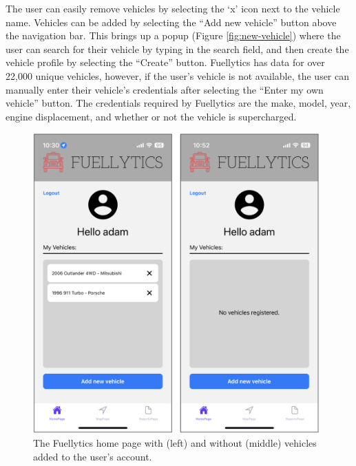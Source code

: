 \documentclass[11pt, oneside]{article}
\begin{document}
The user can easily remove vehicles by selecting the `x' icon next to the vehicle name. Vehicles can be added by selecting the ``Add new vehicle'' button above the navigation bar.  This brings up a popup (Figure \ref{fig:new-vehicle}) where the user can search for their vehicle by typing in the search field, and then create the vehicle profile by selecting the ``Create'' button.  Fuellytics has data for over 22,000 unique vehicles, however, if the user's vehicle is not available, the user can manually enter their vehicle's credentials after selecting the ``Enter my own vehicle'' button.  The credentials required by Fuellytics are the make, model, year, engine displacement, and whether or not the vehicle is supercharged.
\begin{figure}[H]
\centerline{\includegraphics[width=11cm]{img/homepage.png}}
\caption{\label{fig:homepage}The Fuellytics home page with (left) and without (middle) vehicles added to the user's account.}
\end{figure}
\end{document}
